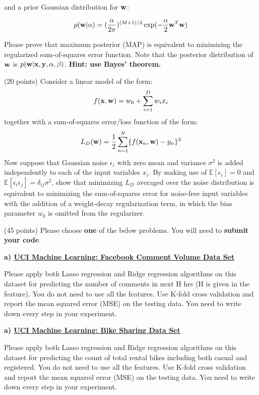 \documentclass{exam}
\newcommand{\xx}{{\bf{x}}}
\newcommand{\yy}{{\bf{y}}}
\newcommand{\ww}{{\bf{w}}}
\begin{document}
\begin{questions}
and  a prior Gaussian distribution for $\ww$:

$$p(\ww|\alpha) = (\frac{\alpha}{2\pi})^{(M+1)/2} \exp(-\frac{\alpha}{2} \ww^T\ww)$$

Please prove that maximum posterior (MAP) is equivalent to minimizing the regularized sum-of-squares error function. Note that the posterior distribution of $\ww$ is $p(\ww|\xx,\yy,\alpha,\beta)$. \textbf{Hint: use Bayes' theorem.}



\newpage
{} (20 points) Consider a linear model of the form:
$$f(\xx,\ww) = w_0 + \sum_{i=1}^D w_i x_i$$
together with a sum-of-squares error/loss function of the form:
$$L_D(\ww) = \frac{1}{2} \sum_{n=1}^N \{f(\xx_n,\ww) - y_n\}^2$$
Now suppose that Gaussian noise $\epsilon_i$ with zero mean and variance $\sigma^2$ is added independently to each of the input variables $x_i$. By making use of $\mathbb{E}[\epsilon_i]=0$ and $\mathbb{E}[\epsilon_i\epsilon_j]=\delta_{ij} \sigma^2$, show that minimizing $L_D$ averaged over the noise distribution is equivalent to minimizing the sum-of-squares error
for noise-free input variables with the addition of a weight-decay regularization term, in which the bias parameter $w_0$ is omitted from the regularizer.

\newpage
{} (45 points) Please choose \textbf{one} of the below problems. You will need to \textbf{submit your code}.

{\bf a) \href{https://archive.ics.uci.edu/ml/datasets/Facebook+Comment+Volume+Dataset}{UCI Machine Learning: Facebook Comment Volume Data Set }}

Please apply both Lasso regression and Ridge regression algorithms on this dataset for predicting the number of comments in next H hrs (H is given in the feature).  You do not need to use all the features. Use K-fold cross validation and report the mean squared error (MSE) on the testing data. You need to write down every step in your experiment.

{\bf a) \href{https://archive.ics.uci.edu/ml/datasets/Bike+Sharing+Dataset}{UCI Machine Learning: Bike Sharing Data Set}}

Please apply both Lasso regression and Ridge regression algorithms on this dataset for predicting the count of total rental bikes including both casual and registered.  You do not need to use all the features. Use K-fold cross validation and report the mean squared error (MSE) on the testing data. You need to write down every step in your experiment. 

 
\end{questions}
\end{document}
